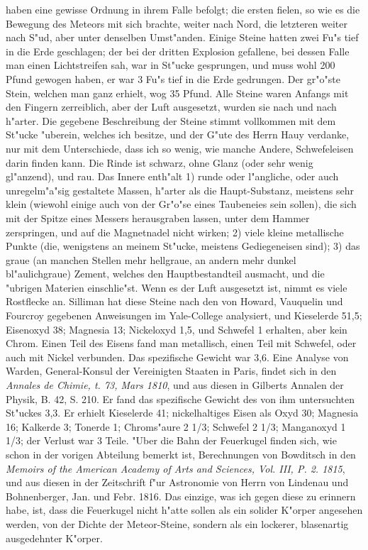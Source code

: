 \documentclass[a4paper, 11pt, oneside, polutonikogreek, german]{article}
\begin{document}
haben eine gewisse Ordnung in ihrem Falle befolgt; die ersten fielen, so wie es die Bewegung des Meteors mit sich brachte, weiter nach Nord, die letzteren weiter nach S"ud, aber unter denselben Umst"anden. Einige Steine hatten zwei Fu"s tief in die Erde geschlagen; der bei der dritten Explosion gefallene, bei dessen Falle man einen Lichtstreifen sah, war in St"ucke gesprungen, und muss wohl 200 Pfund gewogen haben, er war 3 Fu"s tief in die Erde gedrungen. Der gr"o"ste Stein, welchen man ganz erhielt, wog 35 Pfund. Alle Steine waren Anfangs mit den Fingern zerreiblich, aber der Luft ausgesetzt, wurden sie nach und nach h"arter. Die gegebene Beschreibung der Steine stimmt vollkommen mit dem St"ucke "uberein, welches ich besitze, und der G"ute des Herrn Hauy verdanke, nur mit dem Unterschiede, dass ich so wenig, wie manche Andere, Schwefeleisen darin finden kann. Die Rinde ist schwarz, ohne Glanz (oder sehr wenig gl"anzend), und rau. Das Innere enth"alt 1) runde oder l"angliche, oder auch unregelm"a"sig gestaltete Massen, h"arter als die Haupt-Substanz, meistens sehr klein (wiewohl einige auch von der Gr"o"se eines Taubeneies sein sollen), die sich mit der Spitze eines Messers herausgraben lassen, unter dem Hammer zerspringen, und auf die Magnetnadel nicht wirken; 2) viele kleine metallische Punkte (die, wenigstens an meinem St"ucke, meistens Gediegeneisen sind); 3) das graue (an manchen Stellen mehr hellgraue, an andern mehr dunkel bl"aulichgraue) Zement, welches den Hauptbestandteil ausmacht, und die "ubrigen Materien einschlie"st. Wenn es der Luft ausgesetzt ist, nimmt es viele Rostflecke an. Silliman hat diese Steine nach den von Howard, Vauquelin und Fourcroy gegebenen Anweisungen im Yale-College analysiert, und Kieselerde 51,5; Eisenoxyd 38; Magnesia 13; Nickeloxyd 1,5, und Schwefel 1 erhalten, aber kein Chrom. Einen Teil des Eisens fand man metallisch, einen Teil mit Schwefel, oder auch mit Nickel verbunden. Das spezifische Gewicht war 3,6. Eine Analyse von Warden, General-Konsul der Vereinigten Staaten in Paris, findet sich in den \emph{Annales de Chimie, t. 73, Mars 1810}, und aus diesen in Gilberts Annalen der Physik, B. 42, S. 210. Er fand das spezifische Gewicht des von ihm untersuchten St"uckes 3,3. Er erhielt Kieselerde 41; nickelhaltiges Eisen als Oxyd 30; Magnesia 16; Kalkerde 3; Tonerde 1; Chroms"aure 2 1/3; Schwefel 2 1/3; Manganoxyd 1 1/3; der Verlust war 3 Teile. "Uber die Bahn der Feuerkugel finden sich, wie schon in der vorigen Abteilung bemerkt ist, Berechnungen von Bowditsch in den \emph{Memoirs of the American Academy of Arts and Sciences, Vol. III, P. 2. 1815}, und aus diesen in der Zeitschrift f"ur Astronomie von Herrn von Lindenau und Bohnenberger, Jan. und Febr. 1816. Das einzige, was ich gegen diese zu erinnern habe, ist, dass die Feuerkugel nicht h"atte sollen als ein solider K"orper angesehen werden, von der Dichte der Meteor-Steine, sondern als ein lockerer, blasenartig ausgedehnter K"orper.
\end{document}
